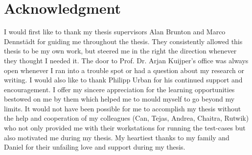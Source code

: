 \documentclass[type=msc,colorback,accentcolor=tud1d,bigchapter]{tudthesis}
\begin{document}
\chapter*{Acknowledgment}
I would first like to thank my thesis supervisors Alan Brunton and Marco Dennst{\"a}dt for guiding me throughout the thesis. They consistently allowed this thesis to be my own work, but steered me in the right the direction whenever they thought I needed it. The door to Prof. Dr. Arjan Kuijper's office was always open whenever I ran into a trouble spot or had a question about my research or writing. I would also like to thank Philipp Urban for his continued support and encouragement. I offer my sincere appreciation for the learning opportunities bestowed on me by them which helped me to mould myself to go beyond my limits. It would not have been possible for me to accomplish my thesis without the help and cooperation of my colleagues (Can, Tejas, Andrea, Chaitra, Rutwik) who not only provided me with their workstations for running the test-cases but also motivated me during my thesis. My heartiest thanks to my family and Daniel for their unfailing love and support during my thesis. 
\newpage

\tableofcontents
\newpage
\listoffigures
\newpage
\lstlistoflistings
\newpage
\listoftables
\newpage


\newpage

\newpage

\newpage

\newpage

\newpage

\newpage

\newpage

\newpage
\printbibliography
\end{document}
